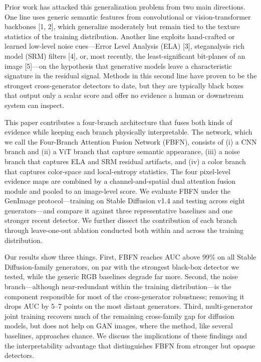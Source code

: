 \documentclass[11pt,a4paper]{article}
\begin{document}
Prior work has attacked this generalization problem from two main directions. One line uses generic semantic features from convolutional or vision-transformer backbones [1, 2], which generalize moderately but remain tied to the texture statistics of the training distribution. Another line exploits hand-crafted or learned low-level noise cues---Error Level Analysis (ELA) [3], steganalysis rich model (SRM) filters [4], or, most recently, the least-significant bit-planes of an image [5]---on the hypothesis that generative models leave a characteristic signature in the residual signal. Methods in this second line have proven to be the strongest cross-generator detectors to date, but they are typically black boxes that output only a scalar score and offer no evidence a human or downstream system can inspect.

This paper contributes a four-branch architecture that fuses both kinds of evidence while keeping each branch physically interpretable. The network, which we call the Four-Branch Attention Fusion Network (FBFN), consists of (i) a CNN branch and (ii) a ViT branch that capture semantic appearance, (iii) a noise branch that captures ELA and SRM residual artifacts, and (iv) a color branch that captures color-space and local-entropy statistics. The four pixel-level evidence maps are combined by a channel-and-spatial dual attention fusion module and pooled to an image-level score. We evaluate FBFN under the GenImage protocol---training on Stable Diffusion v1.4 and testing across eight generators---and compare it against three representative baselines and one stronger recent detector. We further dissect the contribution of each branch through leave-one-out ablation conducted both within and across the training distribution.

Our results show three things. First, FBFN reaches AUC above 99\% on all Stable Diffusion-family generators, on par with the strongest black-box detector we tested, while the generic RGB baselines degrade far more. Second, the noise branch---although near-redundant within the training distribution---is the component responsible for most of the cross-generator robustness; removing it drops AUC by 5--7 points on the most distant generators. Third, multi-generator joint training recovers much of the remaining cross-family gap for diffusion models, but does not help on GAN images, where the method, like several baselines, approaches chance. We discuss the implications of these findings and the interpretability advantage that distinguishes FBFN from stronger but opaque detectors.
\end{document}
